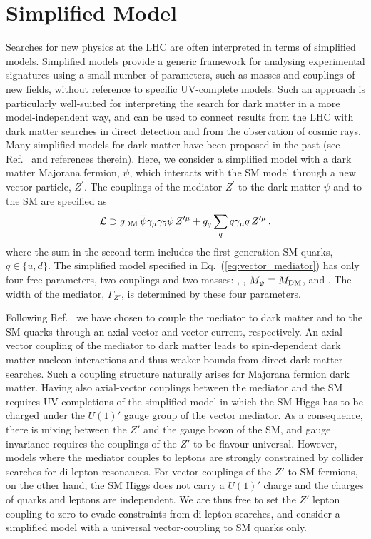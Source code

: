 \documentclass[floatfix]{article}
\begin{document}
\section{Simplified Model}\label{sec:model}
Searches for new physics at the LHC are often interpreted in terms of simplified models. Simplified models provide a generic 
framework for analysing experimental signatures using a small number of parameters, such as masses and 
couplings of new fields, without reference to specific UV-complete models. Such an  approach is particularly 
well-suited for interpreting the search for dark matter in a more model-independent way, and can be used to connect results from the LHC with 
dark matter searches in direct detection and from the observation of cosmic rays. Many simplified models for dark matter have been proposed 
in the past (see Ref.~\cite{Abercrombie:2015wmb} and references therein). Here, we consider a simplified model with a dark matter Majorana 
fermion, $\psi$, which interacts with the SM model through a new vector particle, $Z^\prime$. The couplings of the mediator $Z^\prime$ to 
the dark matter $\psi$ and to the 
SM are specified as %
\begin{align}\label{eq:vector_mediator}
 {\cal L} \supset  g_{\rm DM}\,\overline{\psi} \gamma_{\mu}\gamma_5 \psi\,Z'^{\mu} + g_{q}\sum_{q} \bar q \gamma_{\mu} q \,Z'^{\mu} \,,
\end{align}
%
where the sum in the second term includes the first generation SM quarks, $q \in \{u,d\}$. The simplified model specified in Eq.~(\ref{eq:vector_mediator}) 
has only four free parameters, two couplings and two masses: \GDM, \GQ, $M_\psi \equiv M_{\rm DM}$, and \MZP. The width of the mediator, 
$\Gamma_{Z'}$, is determined by these four parameters. 

Following Ref.~\cite{Kahlhoefer:2015bea} we have chosen to couple the mediator to 
dark matter and to the SM quarks through an axial-vector and vector current, respectively. An axial-vector coupling of the 
mediator to dark matter leads to spin-dependent dark matter-nucleon interactions and thus weaker bounds from direct dark matter searches. 
Such a coupling structure naturally arises for Majorana fermion dark matter. Having also axial-vector couplings between
the mediator and the SM  requires UV-completions of the simplified model in which the SM Higgs has to be charged under 
the $U(1)'$ gauge group of the vector mediator. As a consequence, there is mixing between the $Z'$ and the gauge boson of the SM, and gauge invariance 
requires the couplings of the $Z'$ to be flavour universal. However, models where the mediator couples to leptons 
are strongly constrained by collider searches for di-lepton resonances. For vector couplings of the $Z'$ to  SM fermions, on the other hand, 
the SM Higgs does not carry a $U(1)'$ charge and the charges of quarks and leptons are independent. We are thus free to set the 
$Z'$ lepton coupling to zero to evade constraints from di-lepton searches, and consider a simplified model with a universal vector-coupling 
to SM quarks only. 
\end{document}
